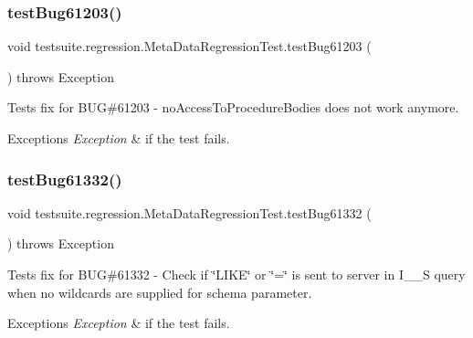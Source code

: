 \subsubsection{\texorpdfstring{test\+Bug61203()}{testBug61203()}}
{\footnotesize\ttfamily void testsuite.\+regression.\+Meta\+Data\+Regression\+Test.\+test\+Bug61203 (\begin{DoxyParamCaption}{ }\end{DoxyParamCaption}) throws Exception}

Tests fix for B\+UG\#61203 -\/ no\+Access\+To\+Procedure\+Bodies does not work anymore.


\begin{DoxyExceptions}{Exceptions}
{\em Exception} & if the test fails. \\
\hline
\end{DoxyExceptions}
\mbox{\label{classtestsuite_1_1regression_1_1_meta_data_regression_test_aaf434af6a2a4b3cc948e8973837c8cca}} 
\subsubsection{\texorpdfstring{test\+Bug61332()}{testBug61332()}}
{\footnotesize\ttfamily void testsuite.\+regression.\+Meta\+Data\+Regression\+Test.\+test\+Bug61332 (\begin{DoxyParamCaption}{ }\end{DoxyParamCaption}) throws Exception}

Tests fix for B\+UG\#61332 -\/ Check if \char`\"{}\+L\+I\+K\+E\char`\"{} or \char`\"{}=\char`\"{} is sent to server in I\+\_\+\+\_\+S query when no wildcards are supplied for schema parameter.


\begin{DoxyExceptions}{Exceptions}
{\em Exception} & if the test fails. \\
\hline
\end{DoxyExceptions}
\mbox{\label{classtestsuite_1_1regression_1_1_meta_data_regression_test_a8d8e4af7ca8136d86aa2ea60237ceb89}} 
